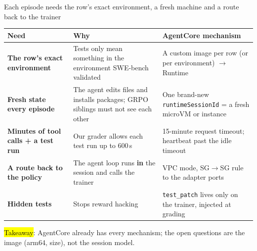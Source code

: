 \begin{frame}{Each episode needs the row's exact environment, a fresh machine and a route back to the trainer}
\scriptsize
\begin{tabularx}{\textwidth}{@{}>{\bfseries}p{3.2cm}XX@{}}
\toprule
Need & Why & AgentCore mechanism\\
\midrule
The row's exact environment & Tests only mean something in the environment SWE-bench validated & A custom image per row (or per environment) $\rightarrow$ Runtime\\
Fresh state every episode & The agent edits files and installs packages; GRPO siblings must not see each other & One brand-new \texttt{runtimeSessionId} = a fresh microVM or instance\\
Minutes of tool calls + a test run & Our grader allows each test run up to 600\,s & 15-minute request timeout; heartbeat past the idle timeout\\
A route back to the policy & The agent loop runs \textbf{in} the session and calls the trainer & VPC mode, SG$\rightarrow$SG rule to the adapter ports\\
Hidden tests & Stops reward hacking & \texttt{test\_patch} lives only on the trainer, injected at grading\\
\bottomrule
\end{tabularx}
\par\vspace{3mm}
{\small\raggedright\hl{Takeaway}: AgentCore already has every mechanism; the open questions are the image (arm64, size), not the session model.\par}
\end{frame}

